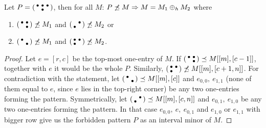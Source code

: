 \begin{lemma}
\label{lemma2}
Let $P=\left(\begin{smallmatrix}\bullet&\bullet&\bullet\\ &\bullet& \end{smallmatrix}\right)$, then for all $M$: $P\not\preceq M\Rightarrow M=M_1\oplus_hM_2$ where
\begin{enumerate}
\item $\left(\begin{smallmatrix}\bullet&\bullet\\ &\bullet\end{smallmatrix}\right)\not\preceq M_1$ and $\left(\begin{smallmatrix} &\bullet\\\bullet& \end{smallmatrix}\right)\not\preceq M_2$ or
\item $\left(\begin{smallmatrix}\bullet& \\ &\bullet\end{smallmatrix}\right)\not\preceq M_1$ and $\left(\begin{smallmatrix}\bullet&\bullet\\\bullet& \end{smallmatrix}\right)\not\preceq M_2$.
\end{enumerate}
\end{lemma}
\begin{proof}
Let $e=[r,c]$ be the top-most one-entry of $M$. If $\left(\begin{smallmatrix}\bullet&\bullet\\ &\bullet\end{smallmatrix}\right)\preceq M[[m],[c-1]]$, together with $e$ it would be the whole $P$. Similarly, $\left(\begin{smallmatrix}\bullet&\bullet\\\bullet& \end{smallmatrix}\right)\not\preceq M[[m],[c+1,n]]$. For contradiction with the statement, let $\left(\begin{smallmatrix}\bullet& \\ &\bullet\end{smallmatrix}\right)\preceq M[[m],[c]]$ and $e_{0,0},\ e_{1,1}$ (none of them equal to $e$, since $e$ lies in the top-right corner) be any two one-entries forming the pattern. Symmetrically, let $\left(\begin{smallmatrix} &\bullet\\\bullet& \end{smallmatrix}\right)\preceq M[[m],[c,n]]$ and $e_{0,1},\ e_{1,0}$ be any two one-entries forming the pattern. In that case $e_{0,0},\ e,\ e_{0,1}$ and $e_{1,0}$ or $e_{1,1}$ with bigger row give us the forbidden pattern $P$ as an interval minor of $M$.
\end{proof}

